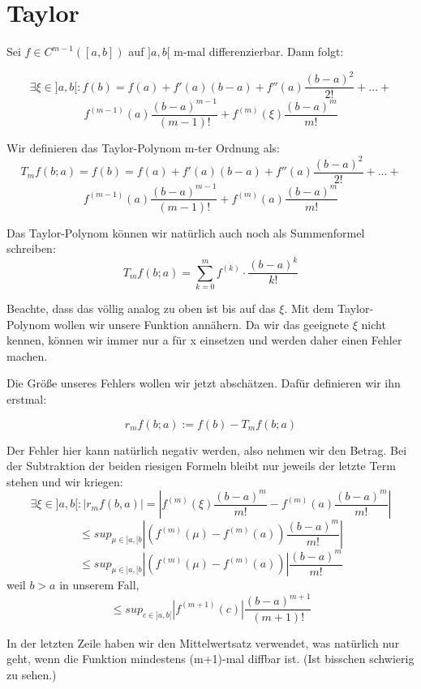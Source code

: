 \section{Taylor}

\begin{theorem}[Taylor]
Sei $f\in C^{m-1}([a,b])$ auf $]a,b[$ m-mal differenzierbar. Dann folgt:

$$\exists \xi \in ]a,b[:
f(b) = f(a) + f'(a)(b-a) + f''(a)\frac{(b-a)^2}{2!} + ... +$$
$$f^{(m-1)}(a)\frac{(b-a)^{m-1}}{(m-1)!} + f^{(m)}(\xi)\frac{(b-a)^m}{m!}$$
\end{theorem}

\begin{definition}
Wir definieren das Taylor-Polynom m-ter Ordnung als:
$$T_mf(b;a) = f(b) = f(a) + f'(a)(b-a) + f''(a)\frac{(b-a)^2}{2!} + ... +$$
$$f^{(m-1)}(a)\frac{(b-a)^{m-1}}{(m-1)!} + f^{(m)}(a)\frac{(b-a)^m}{m!}$$

Das Taylor-Polynom können wir natürlich auch noch als Summenformel schreiben:
$$T_mf(b;a) = \sum_{k=0}^m f^{(k)}\cdot\frac{(b-a)^k}{k!}$$

Beachte, dass das völlig analog zu oben ist bis auf das $\xi$.
Mit dem Taylor-Polynom wollen wir unsere Funktion annähern. Da wir das geeignete $\xi$ nicht kennen, können wir immer nur a für x einsetzen und werden daher einen Fehler machen.
\end{definition}

\begin{concept}
Die Größe unseres Fehlers wollen wir jetzt abschätzen.
Dafür definieren wir ihn erstmal:

$$r_mf(b;a) := f(b)-T_mf(b;a)$$

Der Fehler hier kann natürlich negativ werden, also nehmen wir den Betrag. Bei der Subtraktion der beiden riesigen Formeln bleibt nur jeweils der letzte Term stehen und wir kriegen:
$$\exists \xi \in ]a,b[: |r_mf(b,a)| = |f^{(m)}(\xi)\frac{(b-a)^m}{m!}-f^{(m)}(a)\frac{(b-a)^m}{m!}|$$
$$\leq sup_{\mu \in ]a,[b}|(f^{(m)}(\mu)-f^{(m)}(a))\frac{(b-a)^m}{m!}|$$
$$\leq sup_{\mu \in ]a,[b}|(f^{(m)}(\mu)-f^{(m)}(a))|\frac{(b-a)^m}{m!}$$
weil $b>a$ in unserem Fall,
$$\leq sup_{c \in ]a,b[}|f^{(m+1)}(c)|\frac{(b-a)^{m+1}}{(m+1)!}$$

In der letzten Zeile haben wir den Mittelwertsatz verwendet, was natürlich nur geht, wenn die Funktion mindestens (m+1)-mal diffbar ist. (Ist bisschen schwierig zu sehen.)
\end{concept}



